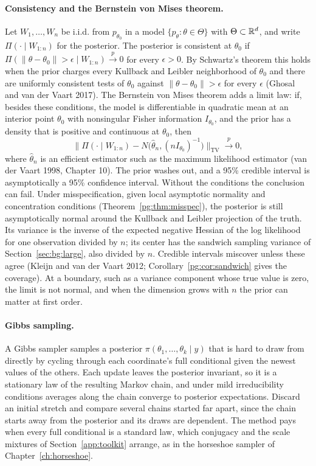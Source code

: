 \paragraph{Consistency and the Bernstein von Mises theorem.} Let $W_1, \dots, W_n$ be i.i.d. from $p_{\theta_0}$ in a model $\{p_\theta : \theta \in \Theta\}$ with $\Theta \subset \mathbb{R}^d$, and write $\Pi(\cdot \mid W_{1:n})$ for the posterior. The posterior is consistent at $\theta_0$ if $\Pi(\|\theta - \theta_0\| > \epsilon \mid W_{1:n}) \xrightarrow{p} 0$ for every $\epsilon > 0$. By Schwartz's theorem this holds when the prior charges every Kullback and Leibler neighborhood of $\theta_0$ and there are uniformly consistent tests of $\theta_0$ against $\|\theta - \theta_0\| > \epsilon$ for every $\epsilon$ (Ghosal and van der Vaart 2017). The Bernstein von Mises theorem adds a limit law: if, besides these conditions, the model is differentiable in quadratic mean at an interior point $\theta_0$ with nonsingular Fisher information $I_{\theta_0}$, and the prior has a density that is positive and continuous at $\theta_0$, then
\[
\bigl\|\Pi(\cdot \mid W_{1:n}) - N\bigl(\hat\theta_n, (nI_{\theta_0})^{-1}\bigr)\bigr\|_{\mathrm{TV}} \xrightarrow{p} 0,
\]
where $\hat\theta_n$ is an efficient estimator such as the maximum likelihood estimator (van der Vaart 1998, Chapter 10). The prior washes out, and a 95\% credible interval is asymptotically a 95\% confidence interval. Without the conditions the conclusion can fail. Under misspecification, given local asymptotic normality and concentration conditions (Theorem~\ref{pg:thm:misspec}), the posterior is still asymptotically normal around the Kullback and Leibler projection of the truth. Its variance is the inverse of the expected negative Hessian of the log likelihood for one observation divided by $n$; its center has the sandwich sampling variance of Section~\ref{sec:bg:large}, also divided by $n$. Credible intervals miscover unless these agree (Kleijn and van der Vaart 2012; Corollary~\ref{pg:cor:sandwich} gives the coverage). At a boundary, such as a variance component whose true value is zero, the limit is not normal, and when the dimension grows with $n$ the prior can matter at first order.

\paragraph{Gibbs sampling.} A Gibbs sampler samples a posterior $\pi(\theta_1, \dots, \theta_k \mid y)$ that is hard to draw from directly by cycling through each coordinate's full conditional given the newest values of the others. Each update leaves the posterior invariant, so it is a stationary law of the resulting Markov chain, and under mild irreducibility conditions averages along the chain converge to posterior expectations. Discard an initial stretch and compare several chains started far apart, since the chain starts away from the posterior and its draws are dependent. The method pays when every full conditional is a standard law, which conjugacy and the scale mixtures of Section~\ref{app:toolkit} arrange, as in the horseshoe sampler of Chapter~\ref{ch:horseshoe}.

